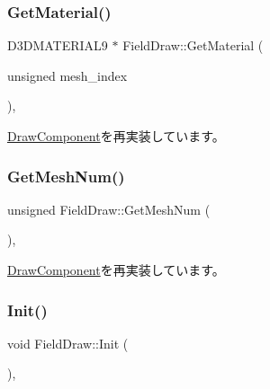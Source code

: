\subsubsection{\texorpdfstring{Get\+Material()}{GetMaterial()}}
{\footnotesize\ttfamily D3\+D\+M\+A\+T\+E\+R\+I\+A\+L9 $\ast$ Field\+Draw\+::\+Get\+Material (\begin{DoxyParamCaption}\item[{unsigned}]{mesh\+\_\+index }\end{DoxyParamCaption})\hspace{0.3cm}{\ttfamily [override]}, {\ttfamily [virtual]}}



\mbox{\hyperlink{class_draw_component_adae078d5139f691997763bf6cac9e25a}{Draw\+Component}}を再実装しています。

\mbox{\label{class_field_draw_a8637a3a4d08d0ac466a370edac39b584}} 
\subsubsection{\texorpdfstring{Get\+Mesh\+Num()}{GetMeshNum()}}
{\footnotesize\ttfamily unsigned Field\+Draw\+::\+Get\+Mesh\+Num (\begin{DoxyParamCaption}{ }\end{DoxyParamCaption})\hspace{0.3cm}{\ttfamily [override]}, {\ttfamily [virtual]}}



\mbox{\hyperlink{class_draw_component_a5f3bbcc8e563b740c0a5535170921c75}{Draw\+Component}}を再実装しています。

\mbox{\label{class_field_draw_a4287d2ce33033b2413c1d3a81b173373}} 
\subsubsection{\texorpdfstring{Init()}{Init()}}
{\footnotesize\ttfamily void Field\+Draw\+::\+Init (\begin{DoxyParamCaption}{ }\end{DoxyParamCaption})\hspace{0.3cm}{\ttfamily [override]}, {\ttfamily [virtual]}}



